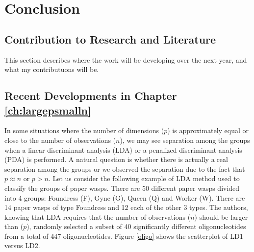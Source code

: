 
\chapter{Conclusion}\label{ch:conclusion}

\section{Contribution to Research and Literature} 

This section describes where the work will be developing over the next year, and what my contributuons will be. 

\section{Recent Developments in Chapter \ref{ch:largepsmalln}}

In some situations where the number of dimensions ($p$) is approximately equal or close to the number of observations ($n$), we may see separation among the groups when a linear discriminant analysis (LDA) or a penalized discriminant analysis (PDA) is performed. A natural question is whether there is actually a real separation among the groups or we observed the separation due to the fact that $p \approx n$ or $p > n$. Let us consider the following example of LDA method used to classify the groups of paper wasps. There are 50 different paper wasps divided into 4 groups: Foundress (F), Gyne (G), Queen (Q) and Worker (W). There are 14 paper wasps of type Foundress and 12 each of the other 3 types. The authors, knowing that LDA requires that the number of observations ($n$) should be larger than ($p$), randomly selected a subset of 40 significantly different oligonucleotides from a total of 447 oligonucleotides. Figure \ref{oligo} shows the scatterplot of LD1 versus LD2.

